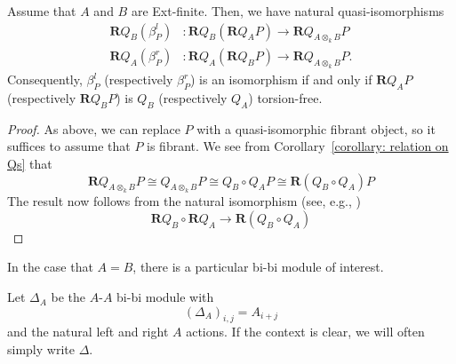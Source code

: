 \begin{proposition} \label{proposition: bi-torsion is a composition}
  Assume that \(A\) and \(B\) are Ext-finite. Then, we have natural quasi-isomorphisms 
  \begin{align*}
    \mathbf{R}Q_B(\beta^l_P) & : \mathbf{R}Q_B(\mathbf{R}Q_A P) \to \mathbf{R}Q_{A \otimes_k B} P\\
    \mathbf{R}Q_A(\beta^r_P) & : \mathbf{R}Q_A(\mathbf{R}Q_B P) \to \mathbf{R}Q_{A \otimes_k B} P.
  \end{align*}
  Consequently, \(\beta^l_P\) (respectively \(\beta^r_P\)) is an isomorphism if and only if \(\mathbf{R}Q_A P\) (respectively \(\mathbf{R}Q_B P\)) is \(Q_B\) (respectively \(Q_A\)) torsion-free.
\end{proposition}


\begin{proof}
As above, we can replace \(P\) with a quasi-isomorphic fibrant object, so it suffices to assume that \(P\) is fibrant.
  We see from Corollary~\ref{corollary: relation on Qs} that
  \[\mathbf{R}Q_{A \otimes_k B} P \cong Q_{A \otimes_k B} P \cong Q_B \circ Q_A P \cong \mathbf{R}(Q_B \circ Q_A) P\]
  The result now follows from the natural isomorphism (see, e.g., \parencite[Theorem 1.3.7]{Hov99})
  \[\mathbf{R}Q_B \circ \mathbf{R}Q_A \to \mathbf{R}(Q_B \circ Q_A)\]
  
\end{proof}

In the case that \(A=B\), there is a particular bi-bi module of interest.

\begin{definition}
  Let \(\Delta_A\) be the \(A\)-\(A\) bi-bi module with 
  \begin{displaymath}
    (\Delta_A)_{i,j} = A_{i+j}
  \end{displaymath}
  and the natural left and right \(A\) actions. If the context is clear, we will often simply write \(\Delta\). 
\end{definition}

